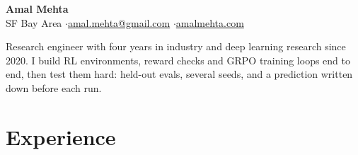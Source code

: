 \documentclass[10pt]{article}
\begin{document}
\fontsize{9.8}{10.7}\selectfont

\begin{center}
{\LARGE\bfseries Amal Mehta}\\[3pt]
SF Bay Area \quad$\cdot$\quad \href{mailto:amal.mehta@gmail.com}{amal.mehta@gmail.com} \quad$\cdot$\quad \href{https://amalmehta.com/}{amalmehta.com}
\end{center}

Research engineer with four years in industry and deep learning research since 2020. I build RL environments, reward checks and GRPO training loops end to end, then test them hard: held-out evals, several seeds, and a prediction written down before each run.

\section*{Experience}
\end{document}
